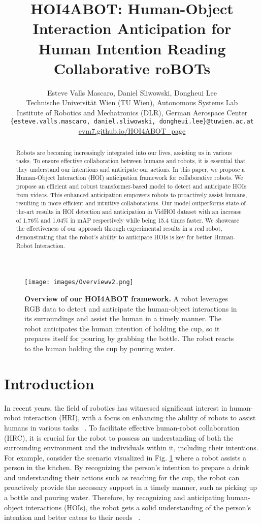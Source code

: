 \documentclass{article}
\title{HOI4ABOT: Human-Object Interaction Anticipation for Human Intention Reading Collaborative roBOTs}
\author{
Esteve Valls Mascaro, Daniel Sliwowski, Dongheui Lee\\
 Technische Universität Wien (TU Wien), Autonomous Systems Lab\\
 Institute of Robotics and Mechatronics (DLR), German Aerospace Center\\
\texttt{\{esteve.valls.mascaro, daniel.sliwowski, dongheui.lee\}@tuwien.ac.at}\\
\href{https://evm7.github.io/HOI4ABOT_page}{evm7.github.io/HOI4ABOT\_page}
}
\begin{document}
\maketitle



\begin{figure}[h!]
    \centering
    \texttt{[image: images/Overviewv2.png]}
    \caption{\textbf{Overview of our HOI4ABOT framework.} A robot leverages RGB data to detect and anticipate the human-object interactions in its surroundings and assist the human in a timely manner. The robot anticipates the human intention of holding the cup, so it prepares itself for pouring by grabbing the bottle. The robot reacts to the human holding the cup by pouring water. }
    \label{fig:Overview}
\end{figure}

\begin{abstract}
Robots are becoming increasingly integrated into our lives, assisting us in various tasks. To ensure effective collaboration between humans and robots, it is essential that they understand our intentions and anticipate our actions. In this paper, we propose a Human-Object Interaction (HOI) anticipation framework for collaborative robots. We propose an efficient and robust transformer-based model to detect and anticipate HOIs from videos.  This enhanced anticipation empowers robots to proactively assist humans, resulting in more efficient and intuitive collaborations. Our model outperforms state-of-the-art results in HOI detection and anticipation in VidHOI dataset with an increase of 1.76\% and 1.04\% in mAP respectively while being 15.4 times faster. We showcase the effectiveness of our approach through experimental results in a real robot, demonstrating that the robot's ability to anticipate HOIs is key for better Human-Robot Interaction.
\end{abstract}





\section{Introduction} In recent years, the field of robotics has witnessed significant interest in human-robot interaction (HRI), with a focus on enhancing the ability of robots to assist humans in various tasks ~\citep{hri1, hri2, hri3, Koppula2016}. To facilitate effective human-robot collaboration (HRC), it is crucial for the robot to possess an understanding of both the surrounding environment and the individuals within it, including their intentions.  For example, consider the scenario visualized in Fig. \ref{fig:Overview} where a robot assists a person in the kitchen. By recognizing the person's intention to prepare a drink and understanding their actions such as reaching for the cup, the robot can proactively provide the necessary support in a timely manner, such as picking up a bottle and pouring water. Therefore, by recognizing and anticipating human-object interactions (HOIs), the robot gets a solid understanding of the person's intention and better caters to their needs ~\citep{hri1}.
\end{document}
